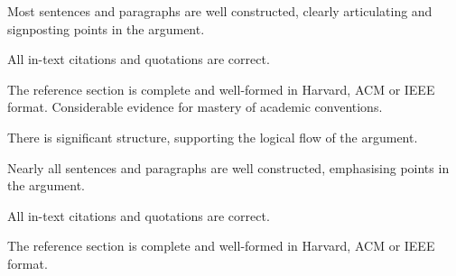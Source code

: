 \documentclass{../../fal_assignment}
\begin{document}
\begin{markingrubric}
            \par Most sentences and paragraphs are well constructed, clearly articulating and signposting points in the argument.
        \par All in-text citations and quotations are correct.
        \par The reference section is complete and well-formed in Harvard, ACM or IEEE format.
        \grade 	Considerable evidence for mastery of academic conventions.
            \par There is significant structure, supporting the logical flow of the argument.
            \par Nearly all sentences and paragraphs are well constructed, emphasising points in the argument.
        \par All in-text citations and quotations are correct.
        \par The reference section is complete and well-formed in Harvard, ACM or IEEE format.
\end{markingrubric}
\end{document}
